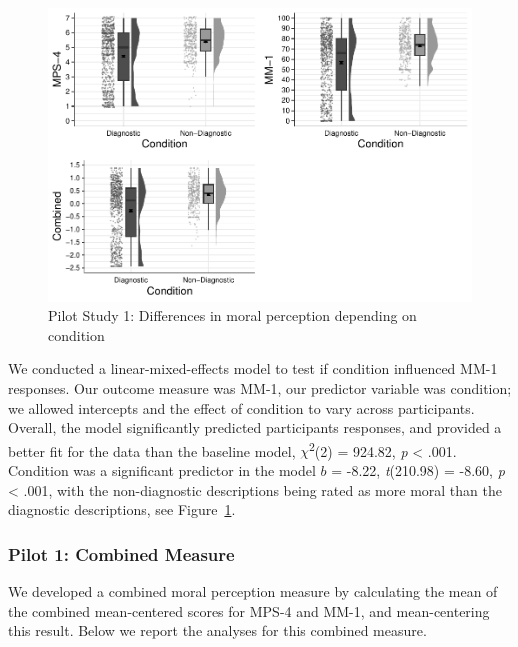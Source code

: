 \documentclass[
  man,floatsintext]{apa6}
\begin{document}
\begin{figure}[!h]
\includegraphics[width=\textwidth,]{Supplementary_files/figure-latex/pilot1bothconditionplot-1} \caption{Pilot Study 1: Differences in moral perception depending on condition}\label{fig:pilot1bothconditionplot}
\end{figure}

We conducted a linear-mixed-effects model to test if condition influenced MM-1 responses. Our outcome measure was MM-1, our predictor variable was condition; we allowed intercepts and the effect of condition to vary across participants. Overall, the model significantly predicted participants responses, and provided a better fit for the data than the baseline model, \(\chi\)\textsuperscript{2}(2) = 924.82, \emph{p} \textless{} .001. Condition was a significant predictor in the model \(b\) = -8.22, \emph{t}(210.98) = -8.60, \emph{p} \textless{} .001, with the non-diagnostic descriptions being rated as more moral than the diagnostic descriptions, see Figure~\ref{fig:pilot1bothconditionplot}.

\subsubsection{Pilot 1: Combined Measure}\label{pilot-1-combined-measure}

We developed a combined moral perception measure by calculating the mean of the combined mean-centered scores for MPS-4 and MM-1, and mean-centering this result. Below we report the analyses for this combined measure.
\end{document}
